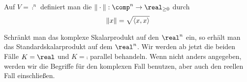 \begin{definition}
	Auf $V=\comp^n$ definiert man die  $\Vert \cdot \Vert:\comp^n\to \real_{\ge 0}$ durch
	\begin{align}
	\Vert x\Vert =\sqrt{\langle  x,x\rangle}\notag
	\end{align}
\end{definition}

\begin{remark}
	Schränkt man das komplexe Skalarprodukt auf den $\real^n$ ein, so erhält man das Standardskalarprodukt auf dem $\real^n$. Wir werden ab jetzt die beiden Fälle $K=\real$ und $K=\comp$ parallel behandeln. Wenn nicht anders angegeben, werden wir die Begriffe für den komplexen Fall benutzen, aber auch den reellen Fall einschließen.
\end{remark}